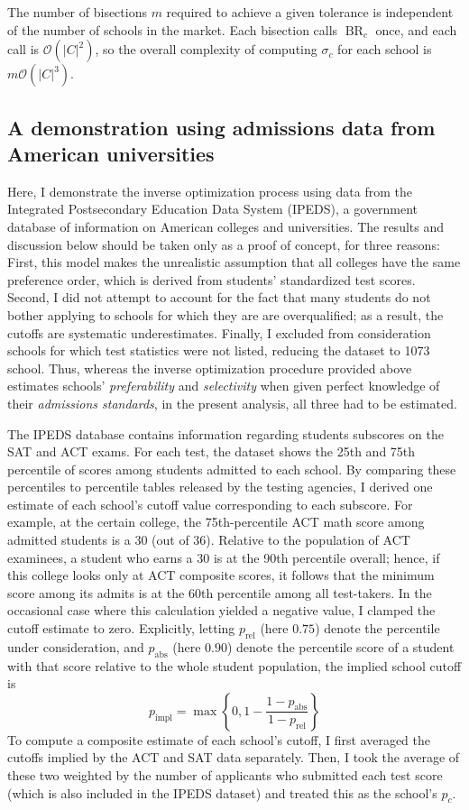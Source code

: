 \documentclass[12pt]{article}
\numberwithin{equation}{subsection}
\theoremstyle{definition}
\begin{document}
The number of bisections $m$ required to achieve a given tolerance is independent of the number of schools in the market. Each bisection calls $\operatorname{BR}_c$ once, and each call is $\mathcal{O}(|C|^2)$, so the overall complexity of computing $\sigma_c$ for each school is $m \mathcal{O}( |C|^3)$.

\subsection{A demonstration using admissions data from American universities}
Here, I demonstrate the inverse optimization process using data from the Integrated Postsecondary Education Data System (IPEDS), a government database of information on American colleges and universities. The results and discussion below should be taken only as a proof of concept, for three reasons: First, this model makes the unrealistic assumption that all colleges have the same preference order, which is derived from students' standardized test scores. Second, I did not attempt to account for the fact that many students do not bother applying to schools for which they are are overqualified; as a result, the cutoffs are systematic underestimates. Finally, I excluded from consideration schools for which test statistics were not listed, reducing the dataset to 1073 school. Thus, whereas the inverse optimization procedure provided above estimates schools' \emph{preferability} and \emph{selectivity} when given perfect knowledge of their \emph{admissions standards}, in the present analysis, all three had to be estimated.

The IPEDS database contains information regarding students subscores on the SAT and ACT exams. For each test, the dataset shows the 25th and 75th percentile of scores among students admitted to each school. By comparing these percentiles to percentile tables released by the testing agencies, I derived one estimate of each school's cutoff value corresponding to each subscore. For example, at the certain college, the 75th-percentile ACT math score among admitted students is a 30 (out of 36). Relative to the population of ACT examinees, a student who earns a 30 is at the 90th percentile overall; hence, if this college looks only at ACT composite scores, it follows that the minimum score among its admits is at the 60th percentile among all test-takers. In the occasional case where this calculation yielded a negative value, I clamped the cutoff estimate to zero. Explicitly, letting $p_{\text{rel}}$ (here $0.75$) denote the percentile under consideration, and $p_{\text{abs}}$ (here $0.90$) denote the percentile score of a student with that score relative to the whole student population, the implied school cutoff is
\[p_{\text{impl}} = \max\left\{0, 1 - \frac{1 - p_{\text{abs}}}{1- p_{\text{rel}}}\right\}\]
To compute a composite estimate of each school's cutoff, I first averaged the cutoffs implied by the ACT and SAT data separately. Then, I took the average of these two weighted by the number of applicants who submitted each test score (which is also included in the IPEDS dataset) and treated this as the school's $p_c$.
\end{document}
